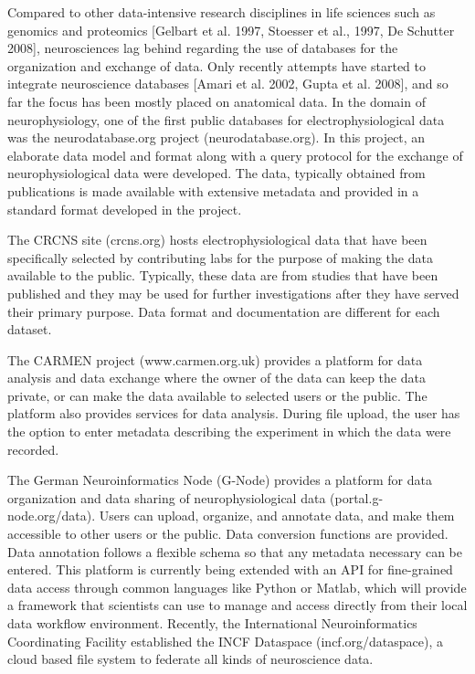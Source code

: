 \documentclass{frontiersSCNS} %
\begin{document}
Compared to other data-intensive research disciplines in life sciences such as
genomics and proteomics [Gelbart et al. 1997, Stoesser et al., 1997, De
Schutter 2008], neurosciences lag behind regarding the use of databases for the
organization and exchange of data. Only recently attempts have started to
integrate neuroscience databases [Amari et al. 2002, Gupta et al. 2008], and so
far the focus has been mostly placed on anatomical data. In the domain of
neurophysiology, one of the first public databases for electrophysiological
data was the neurodatabase.org project (neurodatabase.org). In this project, an
elaborate data model and format along with a query protocol for the exchange of
neurophysiological data were developed. The data, typically obtained from
publications is made available with extensive metadata and provided in a
standard format developed in the project.

The CRCNS site (crcns.org) hosts electrophysiological data that have been
specifically selected by contributing labs for the purpose of making the data
available to the public. Typically, these data are from studies that have been
published and they may be used for further investigations after they have
served their primary purpose. Data format and documentation are different for
each dataset.

The CARMEN project (www.carmen.org.uk) provides a platform for data analysis
and data exchange where the owner of the data can keep the data private, or can
make the data available to selected users or the public. The platform also
provides services for data analysis. During file upload, the user has the
option to enter metadata describing the experiment in which the data were
recorded. 

The German Neuroinformatics Node (G-Node) provides a platform for data
organization and data sharing of neurophysiological data
(portal.g-node.org/data). Users can upload, organize, and annotate data, and
make them accessible to other users or the public. Data conversion functions
are provided. Data annotation follows a flexible schema \citep{Grewe2011} so
that any metadata necessary can be entered. This platform is currently being
extended with an API for fine-grained data access through common languages like
Python or Matlab, which will provide a framework that scientists can use to
manage and access directly from their local data workflow environment.
Recently, the International Neuroinformatics Coordinating Facility established
the INCF Dataspace (incf.org/dataspace), a cloud based file system to federate
all kinds of neuroscience data.
\end{document}
